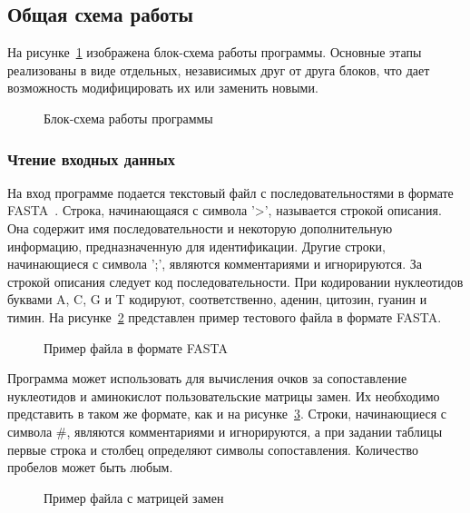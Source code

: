 \subsection[Общая схема работы]{\large Общая схема работы}
\hspace{\parindent} На рисунке~\ref{ris:scheme} изображена блок-схема работы программы. Основные этапы реализованы в виде отдельных, независимых друг от друга блоков, что дает возможность модифицировать их или заменить новыми. 
\begin{figure}[H]
	\caption{Блок-схема работы программы}
	\label{ris:scheme}
\end{figure}

\subsubsection[Чтение входных данных]{\large Чтение входных данных}
\hspace{\parindent} На вход программе подается текстовый файл с последовательностями в формате FASTA~\cite{FASTAformat}. Строка, начинающаяся с символа '>', называется строкой описания. Она содержит имя последовательности и некоторую дополнительную информацию, предназначенную для идентификации. Другие строки, начинающиеся с символа ';', являются комментариями и игнорируются. За строкой описания следует код последовательности. При кодировании нуклеотидов буквами A, C, G и T кодируют, соответственно, аденин, цитозин, гуанин и тимин. На рисунке~\ref{ris:FASTAexample} представлен пример тестового файла в формате FASTA.
\begin{figure}[H]
	\caption{Пример файла в формате FASTA}
	\label{ris:FASTAexample}
\end{figure}

Программа может использовать для вычисления очков за сопоставление нуклеотидов и аминокислот пользовательские матрицы замен. Их необходимо представить в таком же формате, как и на рисунке~\ref{ris:BLOSUM62}.
Строки, начинающиеся с символа $\#$, являются комментариями и игнорируются, а при задании таблицы первые строка и столбец определяют символы сопоставления. Количество пробелов может быть любым.

\begin{figure}[h]
	\caption{Пример файла с матрицей замен}
	\label{ris:BLOSUM62}
\end{figure}

